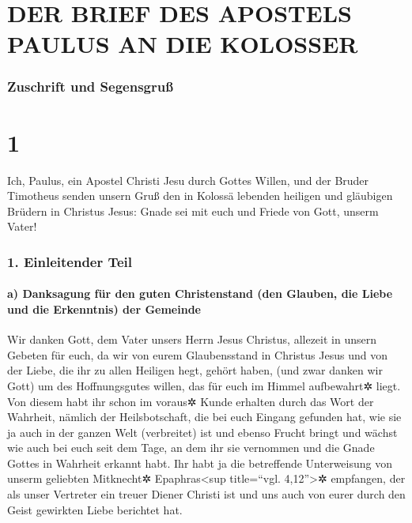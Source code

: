 \hypertarget{der-brief-des-apostels-paulus-an-die-kolosser}{%
\section{DER BRIEF DES APOSTELS PAULUS AN DIE
KOLOSSER}\label{der-brief-des-apostels-paulus-an-die-kolosser}}

\hypertarget{zuschrift-und-segensgruuxdf}{%
\subsubsection{Zuschrift und
Segensgruß}\label{zuschrift-und-segensgruuxdf}}

\hypertarget{section}{%
\section{1}\label{section}}

 Ich, Paulus, ein Apostel Christi Jesu durch Gottes
Willen, und der Bruder Timotheus  senden unsern Gruß den
in Kolossä lebenden heiligen und gläubigen Brüdern in Christus Jesus:
Gnade sei mit euch und Friede von Gott, unserm Vater!

\hypertarget{einleitender-teil}{%
\subsubsection{1. Einleitender Teil}\label{einleitender-teil}}

\hypertarget{a-danksagung-fuxfcr-den-guten-christenstand-den-glauben-die-liebe-und-die-erkenntnis-der-gemeinde}{%
\paragraph{a) Danksagung für den guten Christenstand (den Glauben, die
Liebe und die Erkenntnis) der
Gemeinde}\label{a-danksagung-fuxfcr-den-guten-christenstand-den-glauben-die-liebe-und-die-erkenntnis-der-gemeinde}}

 Wir danken Gott, dem Vater unsers Herrn Jesus Christus,
allezeit in unsern Gebeten für euch,  da wir von eurem
Glaubensstand in Christus Jesus und von der Liebe, die ihr zu allen
Heiligen hegt, gehört haben,  (und zwar danken wir Gott)
um des Hoffnungsgutes willen, das für euch im Himmel aufbewahrt✲ liegt.
Von diesem habt ihr schon im voraus✲ Kunde erhalten durch das Wort der
Wahrheit, nämlich der Heilsbotschaft,  die bei euch
Eingang gefunden hat, wie sie ja auch in der ganzen Welt (verbreitet)
ist und ebenso Frucht bringt und wächst wie auch bei euch seit dem Tage,
an dem ihr sie vernommen und die Gnade Gottes in Wahrheit erkannt habt.
 Ihr habt ja die betreffende Unterweisung von unserm
geliebten Mitknecht✲ Epaphras\textless sup title=``vgl.
4,12''\textgreater✲ empfangen, der als unser Vertreter ein treuer Diener
Christi ist  und uns auch von eurer durch den Geist
gewirkten Liebe berichtet hat.

